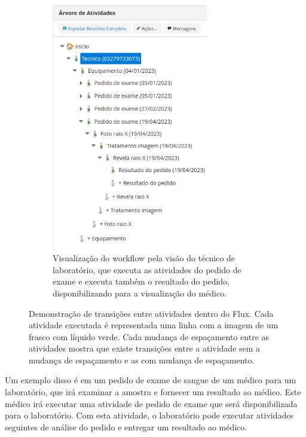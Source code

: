 \begin{figure}
\begin{subfigure}[b]{0.45\textwidth}
        \includegraphics[width=0.75\textwidth]{imgs/Exemplo-Mestrado/arvore_tecnico.png}
        \caption{Visualização do workflow pela visão do técnico de laboratório, que executa as atividades do pedido de exame e executa também o resultado do pedido, disponibilizando para a visualização do médico.}
        \label{fig:arvore_tecnico}
    \end{subfigure}
    \caption{Demonstração de transições entre atividades dentro do Flux. Cada atividade executada é representada uma linha com a imagem de um frasco com líquido verde. Cada mudança de espaçamento entre as atividades mostra que existe transições entre a atividade sem a mudança de espaçamento e as com mudança de espaçamento.}
    \label{fig:arvore_medico_tecnico}

\end{figure}

Um exemplo disso é em um pedido de exame de sangue de um médico para um laboratório, que irá examinar a amostra e fornecer um resultado ao médico. Este médico irá executar uma atividade de pedido de exame que será disponibilizada para o laboratório. Com esta atividade, o laboratório pode executar atividades seguintes de análise do pedido e entregar um resultado ao médico.

